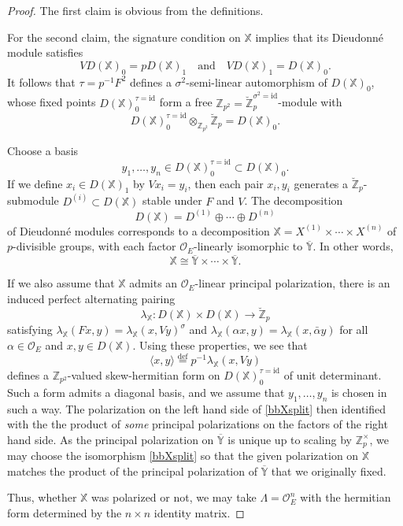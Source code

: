 \documentclass[11pt]{alggeom}
\newcommand{\iso}{\cong}
\newcommand{\define}{\stackrel{\mathrm{def}}{=}}
\newcommand{\Z}{\mathbb Z}
\newcommand{\co}{\mathcal O}
\begin{document}
\begin{proof}
The first claim is obvious from the definitions. 

For the second claim, the signature condition on $\mathbb{X}$ implies that its Dieudonn\'e module satisfies
\[
V D(\mathbb{X})_0 = p D(\mathbb{X})_1 \quad \mbox{and}\quad V D(\mathbb{X})_1 = D(\mathbb{X})_0 .
\]
It follows that  $\tau = p^{-1} F^2$ defines a $\sigma^2$-semi-linear automorphism of $D(\mathbb{X})_0$,
whose fixed points $D(\mathbb{X})_0^{\tau=\mathrm{id}}$
form a free $\Z_{p^2} = \breve{\Z}_p^{\sigma^2=\mathrm{id}}$-module with
\[
D(\mathbb{X})_0^{\tau=\mathrm{id}}\otimes_{\Z_{p^2}} \breve{\Z}_p = D(\mathbb{X})_0.
\]


Choose a basis
\[
y_1,\ldots, y_n \in D(\mathbb{X})_0^{\tau=\mathrm{id}}\subset D(\mathbb{X})_0.
\]
If  we define $x_i \in D(\mathbb{X})_1$ by $V x_i =y_i$, then each pair $x_i,y_i$ generates a $\breve{\Z}_p$-submodule 
$D^{(i)} \subset D(\mathbb{X})$ stable under $F$ and $V$.   The decomposition
\[
D(\mathbb{X}) = D^{(1)} \oplus \cdots \oplus D^{(n)}
\]
of Dieudonn\'e modules corresponds to a decomposition $\mathbb{X} = X^{(1)} \times \cdots \times X^{(n)}$ of $p$-divisible groups, with each factor $\co_E$-linearly isomorphic to $\overline{\mathbb{Y}}$.
  In other words, 
\begin{equation}\label{bbXsplit}
\mathbb{X} \iso \overline{\mathbb{Y}} \times \cdots \times  \overline{\mathbb{Y}}. 
\end{equation}

If we also assume that $\mathbb{X}$ admits an $\co_E$-linear principal polarization, there is an induced  perfect alternating pairing
\[
\lambda_\mathbb{X}: D(\mathbb{X})  \times D(\mathbb{X}) \to \breve{\Z}_p
\]
satisfying $\lambda_\mathbb{X}( F x, y) = \lambda_\mathbb{X}( x, Vy)^\sigma$ and 
$\lambda_\mathbb{X}( \alpha x, y) = \lambda_\mathbb{X}( x, \bar{\alpha} y)$ for all $\alpha\in \co_E$ and $x,y\in D(\mathbb{X})$.
Using these properties, we see that 
\[
\langle x,y \rangle  \define  p^{-1} \lambda_\mathbb{X}( x, V y)
\]
defines a $\Z_{p^2}$-valued skew-hermitian form on $D(\mathbb{X})_0^{\tau=\mathrm{id}}$ of unit determinant.  
Such a form admits a diagonal basis, and we assume that $y_1,\ldots, y_n$ is chosen in such a way.
The  polarization on the left hand side of \eqref{bbXsplit} then identified with the the product of \emph{some} principal polarizations on the factors of the right hand side.
 As the principal polarization on $\overline{\mathbb{Y}}$ is unique up to scaling by $\Z_p^\times$, we may  choose the isomorphism \eqref{bbXsplit} so that the given polarization on $\mathbb{X}$  matches the product of the principal polarization of $\overline{\mathbb{Y}}$ that we originally fixed.
 
 
Thus, whether $\mathbb{X}$ was polarized or not, we may take $\Lambda=\co_E^n$  with the hermitian form determined by the $n\times n$ identity matrix. 
\end{proof}
\end{document}
